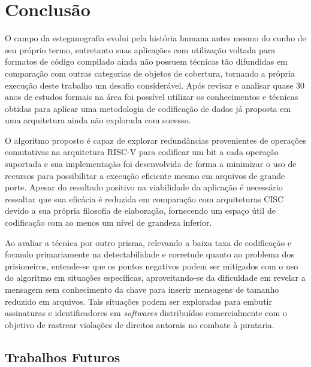 \chapter{Conclusão}

O campo da esteganografia evolui pela história humana antes mesmo do cunho de seu próprio termo, entretanto suas aplicações com utilização voltada para formatos de código compilado ainda não possuem técnicas tão difundidas em comparação com outras categorias de objetos de cobertura, tornando a própria execução deste trabalho um desafio considerável. Após revisar e analisar quase 30 anos de estudos formais na área foi possível utilizar os conhecimentos e técnicas obtidas para aplicar uma metodologia de codificação de dados já proposta em uma arquitetura ainda não explorada com sucesso.

O algoritmo proposto é capaz de explorar redundâncias provenientes de operações comutativas na arquitetura RISC-V para codificar um bit a cada operação suportada e sua implementação foi desenvolvida de forma a minimizar o uso de recursos para possibilitar a execução eficiente mesmo em arquivos de grande porte. Apesar do resultado positivo na viabilidade da aplicação é necessário ressaltar que sua eficácia é reduzida em comparação com arquiteturas CISC devido a sua própria filosofia de elaboração, fornecendo um espaço útil de codificação com ao menos um nível de grandeza inferior. 

Ao avaliar a técnica por outro prisma, relevando a baixa taxa de codificação e focando primariamente na detectabilidade e corretude quanto ao problema dos prisioneiros, entende-se que os pontos negativos podem ser mitigados com o uso do algoritmo em situações específicas, aproveitando-se da dificuldade em revelar a mensagem sem conhecimento da chave para inserir mensagens de tamanho reduzido em arquivos. Tais situações podem ser exploradas para embutir assinaturas e identificadores em \textit{softwares} distribuídos comercialmente com o objetivo de rastrear violações de direitos autorais no combate à pirataria.

\section{Trabalhos Futuros}

